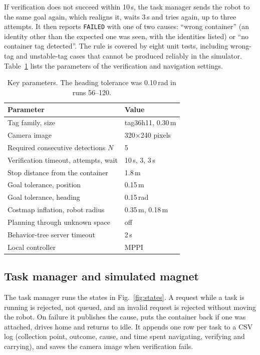 \documentclass[conference]{IEEEtran}
\begin{document}
If verification does not succeed within 10\,s, the task manager sends the robot to the same goal again, which realigns it, waits 3\,s and tries again, up to three attempts. It then reports \texttt{FAILED} with one of two causes: ``wrong container'' (an identity other than the expected one was seen, with the identities listed) or ``no container tag detected''. The rule is covered by eight unit tests, including wrong-tag and unstable-tag cases that cannot be produced reliably in the simulator. Table~\ref{tab:params} lists the parameters of the verification and navigation settings.

\begin{table}[t]
\caption{Key parameters. The heading tolerance was 0.10\,rad in runs 56--120.}
\label{tab:params}
\centering
\small
\begin{tabular}{@{}ll@{}}
\toprule
Parameter & Value \\
\midrule
Tag family, size & tag36h11, 0.30\,m \\
Camera image & 320$\times$240 pixels \\
Required consecutive detections $N$ & 5 \\
Verification timeout, attempts, wait & 10\,s, 3, 3\,s \\
Stop distance from the container & 1.8\,m \\
Goal tolerance, position & 0.15\,m \\
Goal tolerance, heading & 0.15\,rad \\
Costmap inflation, robot radius & 0.35\,m, 0.18\,m \\
Planning through unknown space & off \\
Behavior-tree server timeout & 2\,s \\
Local controller & MPPI \\
\bottomrule
\end{tabular}
\end{table}

\subsection{Task manager and simulated magnet}
The task manager runs the states in Fig.~\ref{fig:states}. A request while a task is running is rejected, not queued, and an invalid request is rejected without moving the robot. On failure it publishes the cause, puts the container back if one was attached, drives home and returns to idle. It appends one row per task to a CSV log (collection point, outcome, cause, and time spent navigating, verifying and carrying), and saves the camera image when verification fails.
\end{document}
